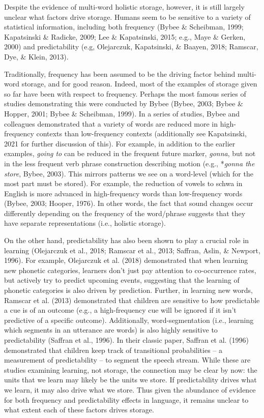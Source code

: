 \documentclass[
  man,floatsintext]{apa6}
\begin{document}
Despite the evidence of multi-word holistic storage, however, it is still largely unclear what factors drive storage. Humans seem to be sensitive to a variety of statistical information, including both frequency (Bybee \& Scheibman, 1999; Kapatsinski \& Radicke, 2009; Lee \& Kapatsinski, 2015; e.g., Maye \& Gerken, 2000) and predictability (e.g, Olejarczuk, Kapatsinski, \& Baayen, 2018; Ramscar, Dye, \& Klein, 2013).

Traditionally, frequency has been assumed to be the driving factor behind multi-word storage, and for good reason. Indeed, most of the examples of storage given so far have been with respect to frequency. Perhaps the most famous series of studies demonstrating this were conducted by Bybee (Bybee, 2003; Bybee \& Hopper, 2001; Bybee \& Scheibman, 1999). In a series of studies, Bybee and colleagues demonstrated that a variety of words are reduced more in high-frequency contexts than low-frequency contexts (additionally see Kapatsinski, 2021 for further discussion of this). For example, in addition to the earlier examples, \emph{going to} can be reduced in the frequent future marker, \emph{gonna}, but not in the less frequent verb phrase construction describing motion (e.g., *\emph{gonna the store}, Bybee, 2003). This mirrors patterns we see on a word-level (which for the most part must be stored). For example, the reduction of vowels to schwa in English is more advanced in high-frequency words than low-frequency words (Bybee, 2003; Hooper, 1976). In other words, the fact that sound changes occur differently depending on the frequency of the word/phrase suggests that they have separate representations (i.e., holistic storage).

On the other hand, predictability has also been shown to play a crucial role in learning (Olejarczuk et al., 2018; Ramscar et al., 2013; Saffran, Aslin, \& Newport, 1996). For example, Olejarczuk et al. (2018) demonstrated that when learning new phonetic categories, learners don't just pay attention to co-occurrence rates, but actively try to predict upcoming events, suggesting that the learning of phonetic categories is also driven by prediction. Further, in learning new words, Ramscar et al. (2013) demonstrated that children are sensitive to how predictable a cue is of an outcome (e.g., a high-frequency cue will be ignored if it isn't predictive of a specific outcome). Additionally, word-segmentation (i.e., learning which segments in an utterance are words) is also highly sensitive to predictability (Saffran et al., 1996). In their classic paper, Saffran et al. (1996) demonstrated that children keep track of transitional probabilities -- a measurement of predictability -- to segment the speech stream. While these are studies examining learning, not storage, the connection may be clear by now: the units that we learn may likely be the units we store. If predictability drives what we learn, it may also drive what we store. Thus given the abundance of evidence for both frequency and predictability effects in language, it remains unclear to what extent each of these factors drives storage.
\end{document}
